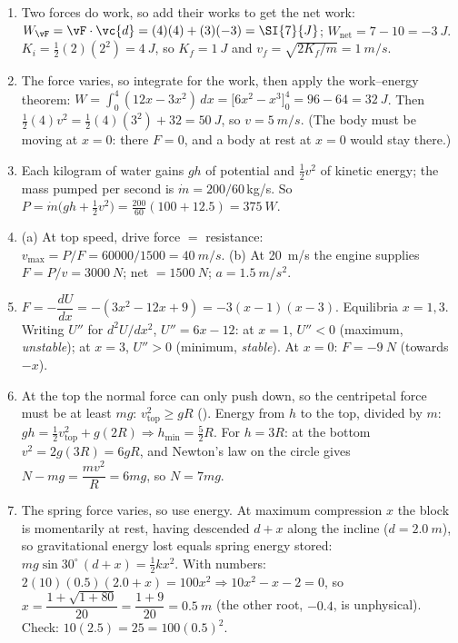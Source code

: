 \begin{enumerate}[label=\textbf{\arabic*.},itemsep=5pt]
\item Two forces do work, so add their works to get the net work: $W_{\vF}=\vF\cdot\vc{d}=(4)(4)+(3)(-3)=\SI{7}{J}$;
$W_{\text{net}}=7-10=\SI{-3}{J}$.
$K_i=\tfrac12(2)(2^2)=\SI{4}{J}$, so $K_f=\SI{1}{J}$ and $v_f=\sqrt{2K_f/m}=\SI{1}{m/s}$. 

\item The force varies, so integrate for the work, then apply the work--energy theorem:
$W=\int_0^4(12x-3x^2)\,dx=\big[6x^2-x^3\big]_0^4=96-64=\SI{32}{J}$. Then
$\tfrac12(4)v^2=\tfrac12(4)(3^2)+32=\SI{50}{J}$, so $v=\SI{5}{m/s}$. (The body must be moving at $x=0$:
there $F=0$, and a body at rest at $x=0$ would stay there.) 

\item Each kilogram of water gains $gh$ of potential and $\tfrac12v^2$ of kinetic energy; the mass pumped
per second is $\dot m=200/60\,$kg/s. So $P=\dot m\big(gh+\tfrac12v^2\big)=\tfrac{200}{60}(100+12.5)
=\SI{375}{W}$. 

\item (a) At top speed, drive force $=$ resistance: $v_{\max}=P/F=60000/1500=\SI{40}{m/s}$.
(b) At \SI{20}{m/s} the engine supplies $F=P/v=\SI{3000}{N}$; net $=\SI{1500}{N}$;
$a=\SI{1.5}{m/s^2}$. 

\item $F=-\dfrac{dU}{dx}=-(3x^2-12x+9)=-3(x-1)(x-3)$. Equilibria $x=1,3$. Writing $U''$ for
$d^2U/dx^2$, $U''=6x-12$: at $x=1$,
$U''<0$ (maximum, \emph{unstable}); at $x=3$, $U''>0$ (minimum, \emph{stable}). At $x=0$:
$F=\SI{-9}{N}$ (towards $-x$). 

\item At the top the normal force can only push down, so the centripetal force must be at least $mg$:
$v_{\text{top}}^2\ge gR$ (). Energy from $h$ to the top, divided by $m$:
$g h=\tfrac12 v_{\text{top}}^2+g(2R)\Rightarrow h_{\min}=\tfrac52 R$. For $h=3R$: at the bottom
$v^2=2g(3R)=6gR$, and Newton's law on the circle gives $N-mg=\dfrac{mv^2}{R}=6mg$, so $N=7mg$.

\item The spring force varies, so use energy. At maximum compression $x$ the block is momentarily at rest,
having descended $d+x$ along the incline ($d=\SI{2.0}{m}$), so gravitational energy lost equals spring
energy stored:
$mg\sin30^\circ\,(d+x)=\tfrac12kx^2$. With numbers: $2(10)(0.5)(2.0+x)=100x^2\Rightarrow
10x^2-x-2=0$, so $x=\dfrac{1+\sqrt{1+80}}{20}=\dfrac{1+9}{20}=\SI{0.5}{m}$ (the other root,
$-0.4$, is unphysical). Check: $10(2.5)=25=100(0.5)^2$.\ \checkmark {}


\end{enumerate}
